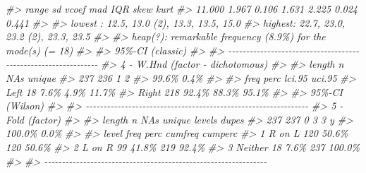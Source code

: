 \documentclass[
]{book}
\newenvironment{Shaded}{\begin{snugshade}}{\end{snugshade}}
\newcommand{\CommentTok}[1]{\textcolor[rgb]{0.56,0.35,0.01}{\textit{#1}}}
\begin{document}
\begin{Shaded}
\begin{Highlighting}[]
\CommentTok{\#\textgreater{}    range      sd   vcoef     mad     IQR    skew    kurt}
\CommentTok{\#\textgreater{}   11.000   1.967   0.106   1.631   2.225   0.024   0.441}
\CommentTok{\#\textgreater{}                                                         }
\CommentTok{\#\textgreater{} lowest : 12.5, 13.0 (2), 13.3, 13.5, 15.0}
\CommentTok{\#\textgreater{} highest: 22.7, 23.0, 23.2 (2), 23.3, 23.5}
\CommentTok{\#\textgreater{} }
\CommentTok{\#\textgreater{} heap(?): remarkable frequency (8.9\%) for the mode(s) (= 18)}
\CommentTok{\#\textgreater{} }
\CommentTok{\#\textgreater{} \textquotesingle{} 95\%{-}CI (classic)}
\CommentTok{\#\textgreater{} }
\CommentTok{\#\textgreater{} {-}{-}{-}{-}{-}{-}{-}{-}{-}{-}{-}{-}{-}{-}{-}{-}{-}{-}{-}{-}{-}{-}{-}{-}{-}{-}{-}{-}{-}{-}{-}{-}{-}{-}{-}{-}{-}{-}{-}{-}{-}{-}{-}{-}{-}{-}{-}{-}{-}{-}{-}{-}{-}{-}{-}{-}{-}{-}{-}{-}{-}{-}{-} }
\CommentTok{\#\textgreater{} 4 {-} W.Hnd (factor {-} dichotomous)}
\CommentTok{\#\textgreater{} }
\CommentTok{\#\textgreater{}   length      n    NAs unique}
\CommentTok{\#\textgreater{}      237    236      1      2}
\CommentTok{\#\textgreater{}           99.6\%   0.4\%       }
\CommentTok{\#\textgreater{} }
\CommentTok{\#\textgreater{}        freq   perc  lci.95  uci.95\textquotesingle{}}
\CommentTok{\#\textgreater{} Left     18   7.6\%    4.9\%   11.7\%}
\CommentTok{\#\textgreater{} Right   218  92.4\%   88.3\%   95.1\%}
\CommentTok{\#\textgreater{} }
\CommentTok{\#\textgreater{} \textquotesingle{} 95\%{-}CI (Wilson)}
\CommentTok{\#\textgreater{} }
\CommentTok{\#\textgreater{} {-}{-}{-}{-}{-}{-}{-}{-}{-}{-}{-}{-}{-}{-}{-}{-}{-}{-}{-}{-}{-}{-}{-}{-}{-}{-}{-}{-}{-}{-}{-}{-}{-}{-}{-}{-}{-}{-}{-}{-}{-}{-}{-}{-}{-}{-}{-}{-}{-}{-}{-}{-}{-}{-}{-}{-}{-}{-}{-}{-}{-}{-}{-} }
\CommentTok{\#\textgreater{} 5 {-} Fold (factor)}
\CommentTok{\#\textgreater{} }
\CommentTok{\#\textgreater{}   length      n    NAs unique levels  dupes}
\CommentTok{\#\textgreater{}      237    237      0      3      3      y}
\CommentTok{\#\textgreater{}          100.0\%   0.0\%                     }
\CommentTok{\#\textgreater{} }
\CommentTok{\#\textgreater{}      level  freq   perc  cumfreq  cumperc}
\CommentTok{\#\textgreater{} 1   R on L   120  50.6\%      120    50.6\%}
\CommentTok{\#\textgreater{} 2   L on R    99  41.8\%      219    92.4\%}
\CommentTok{\#\textgreater{} 3  Neither    18   7.6\%      237   100.0\%}
\CommentTok{\#\textgreater{} }
\CommentTok{\#\textgreater{} {-}{-}{-}{-}{-}{-}{-}{-}{-}{-}{-}{-}{-}{-}{-}{-}{-}{-}{-}{-}{-}{-}{-}{-}{-}{-}{-}{-}{-}{-}{-}{-}{-}{-}{-}{-}{-}{-}{-}{-}{-}{-}{-}{-}{-}{-}{-}{-}{-}{-}{-}{-}{-}{-}{-}{-}{-}{-}{-}{-}{-}{-}{-} }

\end{Highlighting}
\end{Shaded}
\end{document}
